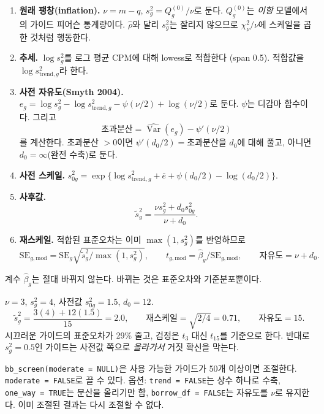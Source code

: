 \documentclass[11pt]{article}
\newcommand{\Var}{\operatorname{Var}}
\begin{document}
\begin{enumerate}[itemsep=2pt]
\item \textbf{원래 팽창(inflation).} $\nu=m-q$, $s_g^2=Q^{(0)}_g/\nu$로 둔다.
$Q^{(0)}_g$는 \emph{이항} 모델에서의 가이드 피어슨 통계량이다. $\hat\rho$와
달리 $s_g^2$는 잘리지 않으므로 $\chi^2_\nu/\nu$에 스케일을 곱한 것처럼 행동한다.
\item \textbf{추세.} $\log s_g^2$를 로그 평균 CPM에 대해 lowess로 적합한다
(span 0.5). 적합값을 $\log s^2_{\text{trend},g}$라 한다.
\item \textbf{사전 자유도(Smyth 2004).}
$e_g=\log s_g^2-\log s^2_{\text{trend},g}-\psi(\nu/2)+\log(\nu/2)$로 둔다.
$\psi$는 디감마 함수이다. 그리고
\[
\text{초과분산}=\widehat{\Var}(e_g)-\psi'(\nu/2)
\]
를 계산한다. 초과분산 $>0$이면 $\psi'(d_0/2)=\text{초과분산}$을 $d_0$에 대해
풀고, 아니면 $d_0=\infty$(완전 수축)로 둔다.
\item \textbf{사전 스케일.} $s_{0g}^2=\exp\{\log s^2_{\text{trend},g}
+\bar e+\psi(d_0/2)-\log(d_0/2)\}$.
\item \textbf{사후값.}
\begin{equation}
\tilde s_g^2=\frac{\nu s_g^2+d_0 s_{0g}^2}{\nu+d_0}.
\end{equation}
\item \textbf{재스케일.} 적합된 표준오차는 이미 $\max(1,s_g^2)$를 반영하므로
\[
\mathrm{SE}_{g,\text{mod}}=\mathrm{SE}_g\sqrt{\tilde s_g^2/\max(1,s_g^2)},\qquad
t_{g,\text{mod}}=\hat\beta_g/\mathrm{SE}_{g,\text{mod}},\qquad
\text{자유도}=\nu+d_0.
\]
\end{enumerate}
계수 $\hat\beta_g$는 절대 바뀌지 않는다. 바뀌는 것은 표준오차와 기준분포뿐이다.

\begin{example}[: 가이드 하나]
$\nu=3$, $s_g^2=4$, 사전값 $s_{0g}^2=1.5$, $d_0=12$.
\[
\tilde s_g^2=\frac{3(4)+12(1.5)}{15}=2.0,\qquad
\text{재스케일}=\sqrt{2/4}=0.71,\qquad \text{자유도}=15.
\]
시끄러운 가이드의 표준오차가 29\% 줄고, 검정은 $t_3$ 대신 $t_{15}$를
기준으로 한다. 반대로 $s_g^2=0.5$인 가이드는 사전값 쪽으로 \emph{올라가서}
거짓 확신을 막는다.
\end{example}

\begin{incode}
\texttt{bb\_screen(moderate = NULL)}은 사용 가능한 가이드가 50개 이상이면
조절한다. \texttt{moderate = FALSE}로 끌 수 있다. 옵션:
\texttt{trend = FALSE}는 상수 하나로 수축, \texttt{one\_way = TRUE}는 분산을
올리기만 함, \texttt{borrow\_df = FALSE}는 자유도를 $\nu$로 유지한다. 이미
조절된 결과는 다시 조절할 수 없다.
\end{incode}
\end{document}

